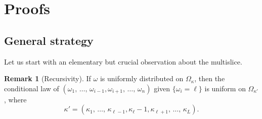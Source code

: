 \documentclass[10pt]{amsart}
\theoremstyle{definition}\newtheorem{defi}[theo]{Definition}\newtheorem{rema}[theo]{Remark}\newtheorem{exam}[theo]{Example}\newtheorem{exem}[theo]{Example}\newtheorem{nota}[theo]{Notation}
\begin{document}
\section{Proofs}


\subsection{General strategy}\label{sec:strategy}
Let us start with an elementary but crucial observation about the multislice.
\begin{rema}[Recursivity]\label{obs}
If $\omega$ is uniformly distributed on $\Omega_\kappa$, then the conditional law of $(\omega_1,\,\ldots,\,\omega_{i-1},\omega_{i+1},\,\ldots,\,\omega_n)$ given $\{\omega_i=\ell\}$ is uniform on $\Omega_{\kappa'}$, where
\[
\kappa'=\left(\kappa_1,\,\ldots,\,\kappa_{\ell-1},\kappa_\ell-1,\kappa_{\ell+1},\,\ldots,\,\kappa_L\right).
\]
\end{rema}
\end{document}
